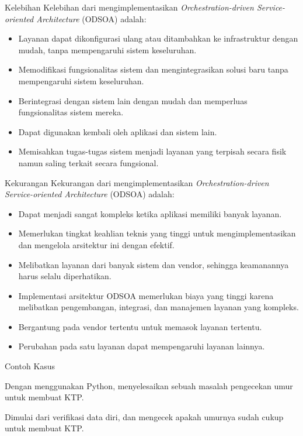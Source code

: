 \documentclass{beamer}
\begin{document}
	\begin{frame}{Kelebihan}
		Kelebihan dari mengimplementasikan \textit{Orchestration-driven Service-oriented Architecture} (ODSOA) adalah:
		\begin{itemize}
			\item Layanan dapat dikonfigurasi ulang atau ditambahkan ke infrastruktur dengan mudah, tanpa mempengaruhi sistem keseluruhan.
			\item Memodifikasi fungsionalitas sistem dan mengintegrasikan solusi baru tanpa mempengaruhi sistem keseluruhan.
			\item Berintegrasi dengan sistem lain dengan mudah dan memperluas fungsionalitas sistem mereka.
			\item Dapat digunakan kembali oleh aplikasi dan sistem lain.
			\item Memisahkan tugas-tugas sistem menjadi layanan yang terpisah secara fisik namun saling terkait secara fungsional.
			
		\end{itemize}
	\end{frame}
	
	\begin{frame}{Kekurangan}
		Kekurangan dari mengimplementasikan \textit{Orchestration-driven Service-oriented Architecture} (ODSOA) adalah:
		\begin{itemize}
			\item Dapat menjadi sangat kompleks ketika aplikasi memiliki banyak layanan.
			\item Memerlukan tingkat keahlian teknis yang tinggi untuk mengimplementasikan dan mengelola arsitektur ini dengan efektif.
			\item Melibatkan layanan dari banyak sistem dan vendor, sehingga keamanannya harus selalu diperhatikan.
			\item Implementasi arsitektur ODSOA memerlukan biaya yang tinggi karena melibatkan pengembangan, integrasi, dan manajemen layanan yang kompleks.
			\item Bergantung pada vendor tertentu untuk memasok layanan tertentu.
			\item Perubahan pada satu layanan dapat mempengaruhi layanan lainnya.
		\end{itemize}
	\end{frame}
	
	\begin{frame}{Contoh Kasus}
		\item Dengan menggunakan Python, menyelesaikan sebuah masalah pengecekan umur untuk membuat KTP.
		\item Dimulai dari verifikasi data diri, dan mengecek apakah umurnya sudah cukup untuk membuat KTP.
	\end{frame}
	
\end{document}
